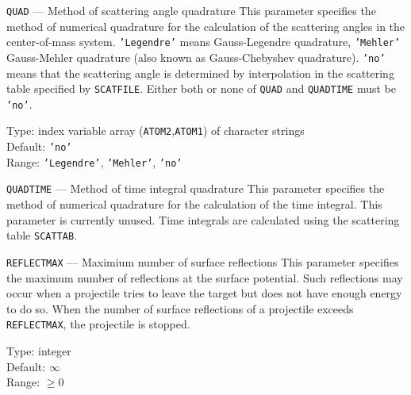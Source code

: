 \begin{keydescription}{\texttt{QUAD} --- Method of scattering angle quadrature}
%
  This parameter specifies the method of numerical quadrature for the
  calculation of the scattering angles in the center-of-mass system. 
  \texttt{'Legendre'} means Gauss-Legendre quadrature, \texttt{'Mehler'} 
  Gauss-Mehler quadrature (also known as Gauss-Chebyshev quadrature). 
  \texttt{'no'} means that the scattering angle is determined by 
  interpolation in the scattering table specified by \texttt{SCATFILE}.
  Either both or none of \texttt{QUAD} and \texttt{QUADTIME} must be 
  \texttt{'no'}.
  \begin{keytab}
    Type:    \> index variable array (\texttt{ATOM2},\texttt{ATOM1}) 
                of character strings \\
    Default: \> \texttt{'no'} \\
    Range:   \> \texttt{'Legendre'}, \texttt{'Mehler'}, \texttt{'no'}
  \end{keytab}
\end{keydescription}

\begin{keydescription}{\texttt{QUADTIME} --- Method of time integral quadrature}
%
  This parameter specifies the method of numerical quadrature for the
  calculation of the time integral. This parameter is currently unused.
  Time integrals are calculated using the scattering table \texttt{SCATTAB}. 
  \iffalse
  \texttt{'Legendre'} means Gauss-Legendre 
  quadrature, \texttt{'Mehler'} Gauss-Mehler quadrature (also known as 
  Gauss-Chebyshev quadrature). \texttt{'no'} means that the time integral is 
  determined by interpolation in the scattering table specified by 
  \texttt{SCATFILE}. 
  \begin{keytab}
    Type:    \> index variable array (\texttt{ATOM2},\texttt{ATOM1}) 
                of character(8) \\
    Default: \> \texttt{'no'} \\
    Range:   \> \texttt{'Legendre'}, \texttt{'Mehler'}, \texttt{'no'}
  \end{keytab}
  \fi
\end{keydescription}

\begin{keydescription}{\texttt{REFLECTMAX} --- Maximium number of surface 
reflections}
%
  This parameter specifies the maximum number of reflections at the surface
  potential. Such reflections may occur when a projectile tries to leave the 
  target but does not have enough energy to do so. When the number of surface 
  reflections of a projectile exceeds \texttt{REFLECTMAX}, the projectile is 
  stopped. 
  \begin{keytab}
    Type:    \> integer \\ 
    Default: \> $\infty$ \\
    Range:   \> $\ge 0$
  \end{keytab}
\end{keydescription}

